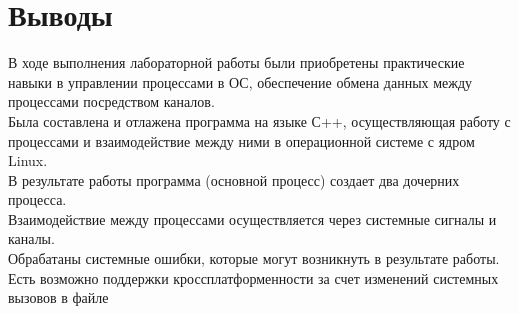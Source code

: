 \section{Выводы}
В ходе выполнения лабораторной работы были приобретены практические навыки в управлении процессами в ОС, обеспечение обмена данных между процессами посредством каналов. \\
Была составлена и отлажена программа на языке С++, осуществляющая работу с процессами и взаимодействие между ними в операционной системе с ядром Linux. \\
В результате работы программа (основной процесс) создает два дочерних процесса. \\
Взаимодействие между процессами осуществляется через системные сигналы и каналы. \\
Обрабатаны системные ошибки, которые могут возникнуть в результате работы. \\
Есть возможно поддержки кроссплатформенности за счет изменений системных вызовов в файле
\pagebreak
